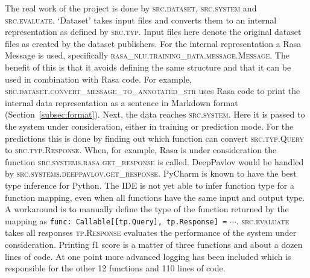 The real work of the project is done by \textsc{src.dataset}, \textsc{src.system} and \textsc{src.evaluate}.
`Dataset' takes input files and converts them to an internal representation as defined by \textsc{src.typ}.
Input files here denote the original dataset files as created by the dataset publishers.
For the internal representation a Rasa Message is used, specifically \textsc{rasa\_nlu.training\_data.message.Message}.
The benefit of this is that it avoids defining the same structure and that it can be used in combination with Rasa code.
For example, \textsc{src.dataset.convert\_message\_to\_annotated\_str} uses Rasa code to print the internal data representation as a sentence in Markdown format (Section~\ref{subsec:format}).
Next, the data reaches \textsc{src.system}.
Here it is passed to the system under consideration, either in training or prediction mode.
For the predictions this is done by finding out which function can convert \textsc{src.typ.Query} to \textsc{src.typ.Response}.
When, for example, Rasa is under consideration the function \textsc{src.systems.rasa.get\_response} is called.
DeepPavlov would be handled by \textsc{src.systems.deeppavlov.get\_response}.
PyCharm is known to have the best type inference for Python.
The IDE is not yet able to infer function type for a function mapping, even when all functions have the same input and output type.
A workaround is to manually define the type of the function returned by the mapping as \verb|func: Callable[[tp.Query], tp.Response] =| $\cdots$.
\textsc{src.evaluate} takes all responses \textsc{tp.Response} evaluates the performance of the system under consideration.
Printing f1 score is a matter of three functions and about a dozen lines of code.
At one point more advanced logging has been included which is responsible for the other 12 functions and 110 lines of code.

